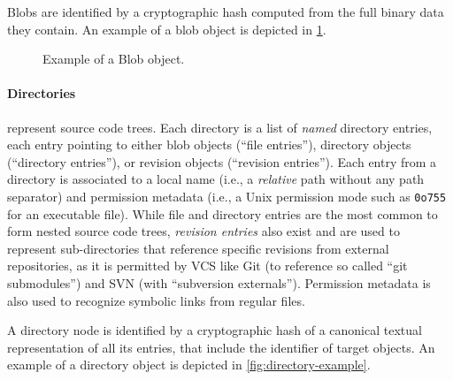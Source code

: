 Blobs are identified by a cryptographic hash computed from the full binary data
they contain. An example of a blob object is depicted in
\cref{fig:blob-example}.

\begin{figure}[ht]
    \centering
    \caption{Example of a Blob object.}%
    \label{fig:blob-example}
\end{figure}



\begin{figure}\centering
{}
\end{figure}
\paragraph{\textbf{Directories}} represent source code trees. Each directory is
a list of \emph{named} directory entries, each entry pointing to either blob
objects (``file entries''), directory objects (``directory entries''), or
revision objects (``revision entries''). Each entry from a directory is
associated to a local name (i.e., a \emph{relative} path without any path
separator) and permission metadata (i.e., a Unix permission mode such as
\texttt{0o755} for an executable file). While file and directory entries are
the most common to form nested source code trees, \emph{revision entries} also
exist and are used to represent sub-directories that reference specific
revisions from external repositories, as it is permitted by VCS like Git (to
reference so called ``git submodules'') and SVN (with ``subversion
externals''). Permission metadata is also used to recognize symbolic links from
regular files.

A directory node is identified by a cryptographic hash of a canonical textual
representation of all its entries, that include the identifier of target
objects. An example of a directory object is depicted in
\cref{fig:directory-example}.

